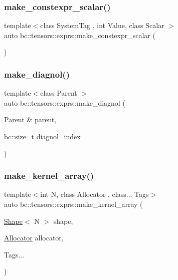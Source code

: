 \mbox{\label{namespacebc_1_1tensors_1_1exprs_a325d76e9469c7c2a72a10b611eae4052}} 
\subsubsection{\texorpdfstring{make\+\_\+constexpr\+\_\+scalar()}{make\_constexpr\_scalar()}}
{\footnotesize\ttfamily template$<$class System\+Tag , int Value, class Scalar $>$ \\
auto bc\+::tensors\+::exprs\+::make\+\_\+constexpr\+\_\+scalar (\begin{DoxyParamCaption}{ }\end{DoxyParamCaption})}

\mbox{\label{namespacebc_1_1tensors_1_1exprs_a9a8865570da6e750497eed712f3f4ce6}} 
\subsubsection{\texorpdfstring{make\+\_\+diagnol()}{make\_diagnol()}}
{\footnotesize\ttfamily template$<$class Parent $>$ \\
auto bc\+::tensors\+::exprs\+::make\+\_\+diagnol (\begin{DoxyParamCaption}\item[{Parent \&}]{parent,  }\item[{\hyperlink{namespacebc_aaf8e3fbf99b04b1b57c4f80c6f55d3c5}{bc\+::size\+\_\+t}}]{diagnol\+\_\+index }\end{DoxyParamCaption})}

\mbox{\label{namespacebc_1_1tensors_1_1exprs_a4082ab702564ee0d4392f185e2bba101}} 
\subsubsection{\texorpdfstring{make\+\_\+kernel\+\_\+array()}{make\_kernel\_array()}}
{\footnotesize\ttfamily template$<$int N, class Allocator , class... Tags$>$ \\
auto bc\+::tensors\+::exprs\+::make\+\_\+kernel\+\_\+array (\begin{DoxyParamCaption}\item[{\hyperlink{structbc_1_1Shape}{Shape}$<$ N $>$}]{shape,  }\item[{\hyperlink{classbc_1_1allocators_1_1Allocator}{Allocator}}]{allocator,  }\item[{Tags...}]{ }\end{DoxyParamCaption})}

